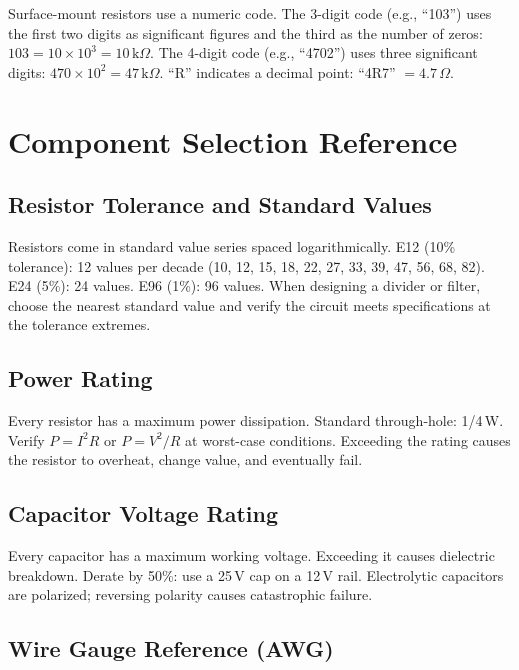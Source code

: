 \documentclass[11pt,letterpaper,twoside,openany]{book}
\begin{document}
\begin{tipbox}
Surface-mount resistors use a numeric code. The 3-digit code (e.g., ``103'') uses the first two digits as significant figures and the third as the number of zeros: $103 = 10 \times 10^3 = 10\,\text{k}\Omega$. The 4-digit code (e.g., ``4702'') uses three significant digits: $470 \times 10^2 = 47\,\text{k}\Omega$. ``R'' indicates a decimal point: ``4R7'' $= 4.7\,\Omega$.
\end{tipbox}


\section{Component Selection Reference}

\subsection{Resistor Tolerance and Standard Values}
Resistors come in standard value series spaced logarithmically. E12 (10\% tolerance): 12 values per decade (10, 12, 15, 18, 22, 27, 33, 39, 47, 56, 68, 82). E24 (5\%): 24 values. E96 (1\%): 96 values. When designing a divider or filter, choose the nearest standard value and verify the circuit meets specifications at the tolerance extremes.

\subsection{Power Rating}
Every resistor has a maximum power dissipation. Standard through-hole: 1/4\,W. Verify $P = I^2R$ or $P = V^2/R$ at worst-case conditions. Exceeding the rating causes the resistor to overheat, change value, and eventually fail.

\subsection{Capacitor Voltage Rating}
Every capacitor has a maximum working voltage. Exceeding it causes dielectric breakdown. Derate by 50\%: use a 25\,V cap on a 12\,V rail. Electrolytic capacitors are polarized; reversing polarity causes catastrophic failure.

\subsection{Wire Gauge Reference (AWG)}
\end{document}

